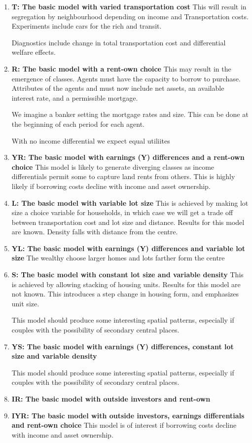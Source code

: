 \begin{enumerate}
\item \textbf{T: The basic model with varied transportation cost }
This will result in segregation by neighbourhood depending on income and Transportation costs. Experiments include cars for the rich and  transit. 

Diagnostics include change in total transportation cost and differential welfare effects.

\item \textbf{R: The basic model with a rent-own choice}
This may result in the emergence of classes. Agents must have the capacity to borrow to purchase. Attributes of the agents and must now include  net assets,  an available interest rate, and a permissible mortgage.

We imagine a banker setting the mortgage rates and size. This can be done at the beginning of each period for each agent. 

With no income differential we expect equal utiliites

\item \textbf{YR: The basic model with earnings (Y) differences and a rent-own choice}
This model is likely to generate diverging classes as income differentials permit some to capture land rents from others. This is highly likely if borrowing costs decline with income and asset ownership.

\item \textbf{L: The basic model with variable lot size}
This is achieved by making lot size a choice variable for households, in which case we will get a trade off between transportation cost and lot size and distance. Results for this model are known. Density  falls with distance from the centre. 

\item \textbf{YL: The basic model with earnings (Y) differences and variable lot size}
The wealthy choose larger homes and lots farther form the centre

\item \textbf{S: The basic model with constant lot size and variable density}
This is achieved by allowing stacking of housing units. Results for this model are not known. This introduces a step change in housing form, and emphasizes unit size.

This model should produce some interesting spatial patterns, especially if couples with the possibility of secondary central places.

\item \textbf{YS: The basic model with earnings (Y) differences, constant lot size and variable density}

This model should produce some interesting spatial patterns, especially if couples with the possibility of secondary central places.

\item \textbf{IR: The basic model with outside investors and rent-own}

\item \textbf{IYR: The basic model with outside investors, earnings differentials and rent-own choice} This model is of interest if borrowing costs decline with income and asset ownership.
\end{enumerate}
